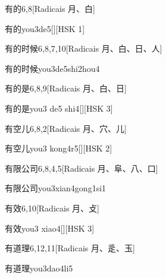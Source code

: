 \begin{entry}{有的}{6,8}[Radicais ⽉、⽩]
  \begin{phonetics}{有的}{you3de5}[][HSK 1]
  \end{phonetics}
\end{entry}

\begin{entry}{有的时候}{6,8,7,10}[Radicais ⽉、⽩、⽇、⼈]
  \begin{phonetics}{有的时候}{you3de5shi2hou4}
  \end{phonetics}
\end{entry}

\begin{entry}{有的是}{6,8,9}[Radicais ⽉、⽩、⽇]
  \begin{phonetics}{有的是}{you3 de5 shi4}[][HSK 3]
  \end{phonetics}
\end{entry}

\begin{entry}{有空儿}{6,8,2}[Radicais ⽉、⽳、⼉]
  \begin{phonetics}{有空儿}{you3 kong4r5}[][HSK 2]
  \end{phonetics}
\end{entry}

\begin{entry}{有限公司}{6,8,4,5}[Radicais ⽉、⾩、⼋、⼝]
  \begin{phonetics}{有限公司}{you3xian4gong1si1}
  \end{phonetics}
\end{entry}

\begin{entry}{有效}{6,10}[Radicais ⽉、⽁]
  \begin{phonetics}{有效}{you3 xiao4}[][HSK 3]
  \end{phonetics}
\end{entry}

\begin{entry}{有道理}{6,12,11}[Radicais ⽉、⾡、⽟]
  \begin{phonetics}{有道理}{you3dao4li5}
  \end{phonetics}
\end{entry}

